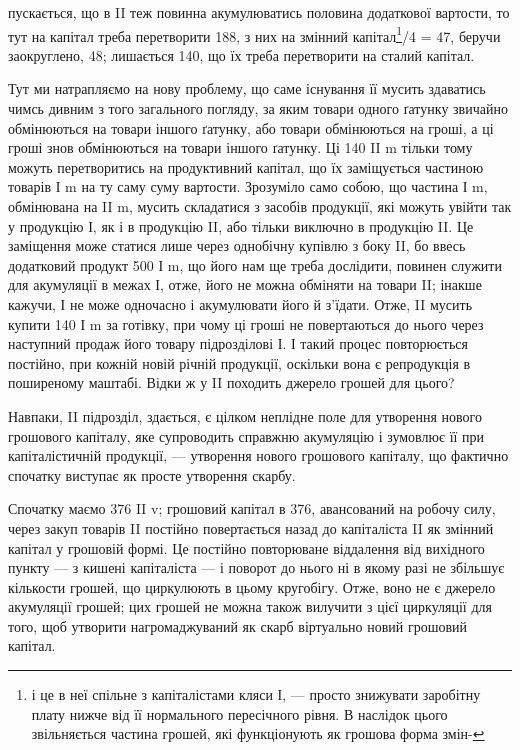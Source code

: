 \parcont{}  %
пускається, що в II теж повинна акумулюватись половина додаткової вартости,
то тут на капітал треба перетворити 188, з них на змінний капітал\footnote{
і це в неї спільне з капіталістами кляси І, — просто знижувати
заробітну плату нижче від її нормального пересічного рівня. В наслідок цього
звільняється частина грошей, які функціонують як грошова форма змін-
}/4 = 47, беручи заокруглено, 48; лишається 140, що їх треба
перетворити на сталий капітал.

Тут ми натрапляємо на нову проблему, що саме існування її мусить
здаватись чимсь дивним з того загального погляду, за яким
товари одного ґатунку звичайно обмінюються на товари іншого ґатунку,
або товари обмінюються на гроші, а ці гроші знов обмінюються на
товари іншого ґатунку. Ці 140 II m тільки тому можуть перетворитись
на продуктивний капітал, що їх заміщується частиною товарів І m на
ту саму суму вартости. Зрозуміло само собою, що частина І m, обмінювана
на II m, мусить складатися з засобів продукції, які можуть
увійти так у продукцію І, як і в продукцію II, або тільки виключно
в продукцію II. Це заміщення може статися лише через
однобічну купівлю з боку II, бо ввесь додатковий продукт 500 І m, що
його нам ще треба дослідити, повинен служити для акумуляції в межах І,
отже, його не можна обміняти на товари II; інакше кажучи, І не може
одночасно і акумулювати його й з’їдати. Отже, II мусить купити 140 І m
за готівку, при чому ці гроші не повертаються до нього через наступний
продаж його товару підрозділові І. І такий процес повторюється постійно,
при кожній новій річній продукції, оскільки вона є репродукція в поширеному
маштабі. Відки ж у II походить джерело грошей для цього?

Навпаки, II підрозділ, здається, є цілком неплідне поле для утворення
нового грошового капіталу, яке супроводить справжню акумуляцію і
зумовлює її при капіталістичній продукції, — утворення нового грошового
капіталу, що фактично спочатку виступає як просте утворення
скарбу.

Спочатку маємо 376 II v; грошовий капітал в 376, авансований на
робочу силу, через закуп товарів II постійно повертається назад до
капіталіста II як змінний капітал у грошовій формі. Це постійно повторюване
віддалення від вихідного пункту — з кишені капіталіста — і поворот
до нього ні в якому разі не збільшує кількости грошей, що
циркулюють в цьому кругобігу. Отже, воно не є джерело акумуляції
грошей; цих грошей не можна також вилучити з цієї циркуляції для
того, щоб утворити нагромаджуваний як скарб віртуально новий грошовий
капітал.

